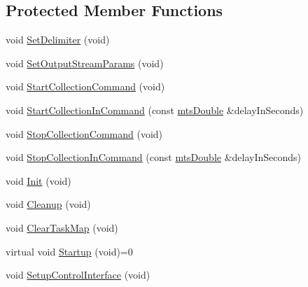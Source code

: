 \subsection*{Protected Member Functions}
\begin{DoxyCompactItemize}
\item 
void \hyperlink{classmts_collector_base_a8f7a140dc2f96646b191680697fc341a}{Set\-Delimiter} (void)
\item 
void \hyperlink{classmts_collector_base_a12e7d75810e849d08f81b22ba15b2651}{Set\-Output\-Stream\-Params} (void)
\item 
void \hyperlink{classmts_collector_base_a9710912f3c7a2a0e27210ec3e4031836}{Start\-Collection\-Command} (void)
\item 
void \hyperlink{classmts_collector_base_a52b9537fdb6632e1efa8dc5e17aad013}{Start\-Collection\-In\-Command} (const \hyperlink{mts_generic_object_proxy_8h_a31e76b0190a8d3f9838626cd7b47bd75}{mts\-Double} \&delay\-In\-Seconds)
\item 
void \hyperlink{classmts_collector_base_ab1b32657c9ea39cc657d562c5b1be802}{Stop\-Collection\-Command} (void)
\item 
void \hyperlink{classmts_collector_base_ab99c5d1e2cd381ead225ac57b2ec620d}{Stop\-Collection\-In\-Command} (const \hyperlink{mts_generic_object_proxy_8h_a31e76b0190a8d3f9838626cd7b47bd75}{mts\-Double} \&delay\-In\-Seconds)
\item 
void \hyperlink{classmts_collector_base_a7faf69da541094f4ba045165e812b7df}{Init} (void)
\item 
void \hyperlink{classmts_collector_base_a1ec6f11c284cf013ab3cf7556cd04896}{Cleanup} (void)
\item 
void \hyperlink{classmts_collector_base_a9488170795470dd8ca10ae14179e9a6f}{Clear\-Task\-Map} (void)
\item 
virtual void \hyperlink{classmts_collector_base_a7e3ca6f1f52519df43dc1d70202968f2}{Startup} (void)=0
\item 
void \hyperlink{classmts_collector_base_a8cec0a5fdf2aa587718f3dacd9e98572}{Setup\-Control\-Interface} (void)
\end{DoxyCompactItemize}
